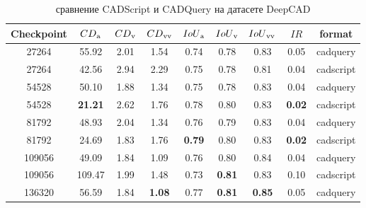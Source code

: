 \begin{table}[]
	\centering
	\caption{сравнение CADScript и CADQuery на датасете DeepCAD}
	\begin{tabular}{c c c c c c c c c}
		\hline
		\textbf{Checkpoint} & $CD\textsubscript{a}$ & $CD\textsubscript{v}$ & $CD\textsubscript{vv}$ & $IoU\textsubscript{a}$ & $IoU\textsubscript{v}$ & $IoU\textsubscript{vv}$ & $IR$          & format    \\
		\hline
		27264               & 55.92                 & 2.01                  & 1.54                   & 0.74                   & 0.78                   & 0.83                    & 0.05          & cadquery  \\
		27264               & 42.56                 & 2.94                  & 2.29                   & 0.75                   & 0.78                   & 0.81                    & 0.04          & cadscript \\
		54528               & 50.10                 & 1.88                  & 1.34                   & 0.75                   & 0.78                   & 0.83                    & 0.04          & cadquery  \\
		54528               & \textbf{21.21}        & 2.62                  & 1.76                   & 0.78                   & 0.80                   & 0.83                    & \textbf{0.02} & cadscript \\
		81792               & 48.93                 & 2.04                  & 1.34                   & 0.76                   & 0.79                   & 0.83                    & 0.04          & cadquery  \\
		81792               & 24.69                 & 1.83                  & 1.76                   & \textbf{0.79}          & 0.80                   & 0.83                    & \textbf{0.02} & cadscript \\
		109056              & 49.09                 & 1.84                  & 1.09                   & 0.76                   & 0.80                   & 0.84                    & 0.04          & cadquery  \\
		109056              & 109.47                & 1.99                  & 1.48                   & 0.73                   & \textbf{0.81}          & 0.83                    & 0.10          & cadscript \\
		136320              & 56.59                 & 1.84                  & \textbf{1.08}          & 0.77                   & \textbf{0.81}          & \textbf{0.85}           & 0.05          & cadquery  \\

\end{tabular}
\end{table}
